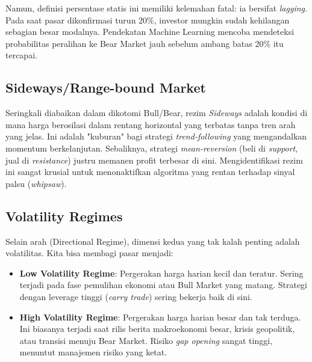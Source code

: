 \documentclass[12pt,a4paper]{book}
\begin{document}
Namun, definisi persentase statis ini memiliki kelemahan fatal: ia bersifat \textit{lagging}. Pada saat pasar dikonfirmasi turun 20\%, investor mungkin sudah kehilangan sebagian besar modalnya. Pendekatan Machine Learning mencoba mendeteksi probabilitas peralihan ke Bear Market jauh sebelum ambang batas 20\% itu tercapai.

\subsection{Sideways/Range-bound Market}
Seringkali diabaikan dalam dikotomi Bull/Bear, rezim \textit{Sideways} adalah kondisi di mana harga berosilasi dalam rentang horizontal yang terbatas tanpa tren arah yang jelas. Ini adalah "kuburan" bagi strategi \textit{trend-following} yang mengandalkan momentum berkelanjutan. Sebaliknya, strategi \textit{mean-reversion} (beli di \textit{support}, jual di \textit{resistance}) justru memanen profit terbesar di sini. Mengidentifikasi rezim ini sangat krusial untuk menonaktifkan algoritma yang rentan terhadap sinyal palsu (\textit{whipsaw}).

\subsection{Volatility Regimes}
Selain arah (Directional Regime), dimensi kedua yang tak kalah penting adalah volatilitas. Kita bisa membagi pasar menjadi:
\begin{itemize}
    \item \textbf{Low Volatility Regime}: Pergerakan harga harian kecil dan teratur. Sering terjadi pada fase pemulihan ekonomi atau Bull Market yang matang. Strategi dengan leverage tinggi (\textit{carry trade}) sering bekerja baik di sini.
    \item \textbf{High Volatility Regime}: Pergerakan harga harian besar dan tak terduga. Ini biasanya terjadi saat rilis berita makroekonomi besar, krisis geopolitik, atau transisi menuju Bear Market. Risiko \textit{gap opening} sangat tinggi, menuntut manajemen risiko yang ketat.
\end{itemize}
\end{document}
